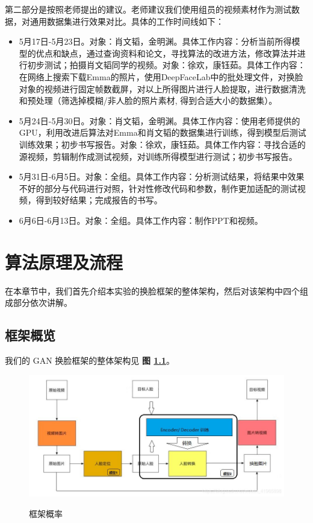 第二部分是按照老师提出的建议。老师建议我们使用组员的视频素材作为测试数据，对通用数据集进行效果对比。具体的工作时间线如下：

\begin{itemize}
	\item 5月17日-5月23日。对象：肖文韬，金明渊。具体工作内容：分析当前所得模型的优点和缺点，通过查询资料和论文，寻找算法的改进方法，修改算法并进行初步测试；拍摄肖文韬同学的视频。对象：徐欢，康钰茹。具体工作内容：在网络上搜索下载Emma的照片，使用DeepFaceLab中的批处理文件，对换脸对象的视频进行固定帧数截屏，对以上所得图片进行人脸提取，进行数据清洗和预处理（筛选掉模糊/非人脸的照片素材, 得到合适大小的数据集）。
	\item 5月24日-5月30日。对象：肖文韬，金明渊。具体工作内容：使用老师提供的GPU，利用改进后算法对Emma和肖文韬的数据集进行训练，得到模型后测试训练效果；初步书写报告。对象：徐欢，康钰茹。具体工作内容：寻找合适的源视频，剪辑制作成测试视频，对训练所得模型进行测试；初步书写报告。
	\item 5月31日-6月5日。对象：全组。具体工作内容：分析测试结果，将结果中效果不好的部分与代码进行对照，针对性修改代码和参数，制作更加适配的测试视频，得到较好结果；完成报告的书写。
	\item 6月6日-6月13日。对象：全组。具体工作内容：制作PPT和视频。
\end{itemize}

\chapter{算法原理及流程}
\label{methodology}
在本章节中，我们首先介绍本实验的换脸框架的整体架构，然后对该架构中四个组成部分依次讲解。

\section{框架概览}
我们的 GAN 换脸框架的整体架构见 \textbf{图 \ref{fig:overall}}。

\begin{figure}[h!]
	\caption{框架概率}
	\centering
	\includegraphics[width=\textwidth]{overall.jpg}
	\label{fig:overall}
\end{figure}

